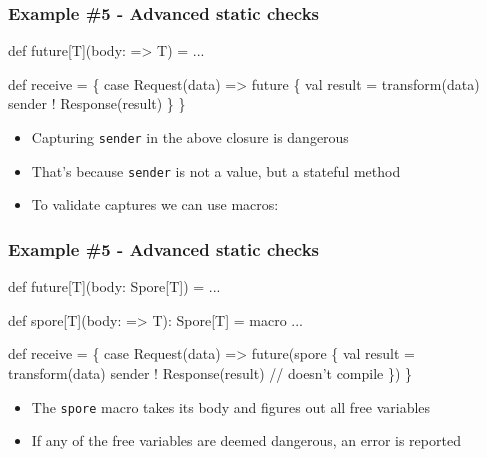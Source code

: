\documentclass[svgnames,hyperref={bookmarks=false}]{beamer}
\begin{document}
\begin{frame}[fragile, t]
\frametitle{Example \#5 - Advanced static checks}

\begin{semiverbatim}
def future[T](body: => T) = ...

def receive = \{
  case Request(data) =>
    future \{
      val result = transform(data)
      sender ! Response(result)
    \}
\}

\end{semiverbatim}

\begin{itemize}
\item Capturing \texttt{sender} in the above closure is dangerous
\item That's because \texttt{sender} is not a value, but a stateful method
\item To validate captures we can use macros: 
\end{itemize}
\end{frame}

\begin{frame}[fragile, t]
\frametitle{Example \#5 - Advanced static checks}

\begin{semiverbatim}
def future[T](body: \alert{Spore[T]}) = ...

\alert{def spore[T](body: => T): Spore[T] = macro ...}

def receive = \{
  case Request(data) =>
    future(\alert{spore \{}
      val result = transform(data)
      sender ! Response(result) \alert{// doesn't compile}
    \alert{\}})
\}

\end{semiverbatim}

\begin{itemize}
\item The \texttt{spore} macro takes its body and figures out all free variables
\item If any of the free variables are deemed dangerous, an error is reported
\end{itemize}
\end{frame}
\end{document}
